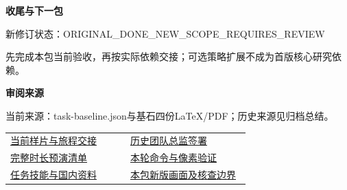 \documentclass[11pt,a4paper]{article}
\newcommand{\reviewsubsection}[1]{\par\Needspace{4\baselineskip}\vspace{4pt}\begin{center}{\titlelatin\titlecjk\bfseries\fontsize{12}{18}\selectfont #1}\end{center}}
\begin{document}
\reviewsubsection{3.3 收尾与下一包}
新修订状态：ORIGINAL\_\allowbreak{}DONE\_\allowbreak{}NEW\_\allowbreak{}SCOPE\_\allowbreak{}REQUIRES\_\allowbreak{}REVIEW


先完成本包当前验收，再按实际依赖交接；可选策略扩展不成为首版核心研究依赖。


\begin{minipage}{\linewidth}
\reviewsubsection{3.4 审阅来源}
当前来源：task-\allowbreak{}baseline.json与基石四份LaTeX/\allowbreak{}PDF；历史来源见归档总结。


\begingroup\small\setlength{\tabcolsep}{4pt}\begin{tabular}{@{}p{0.48\linewidth}p{0.48\linewidth}@{}}
\href{file:///D:/Agent/srp/agent/tasks/V-04/outputs/current-preview.md}{当前样片与旅程交接} & \href{file:///D:/Agent/srp/agent/governance/planning/2026-08-05_SRP_IJHCI_\%E5\%85\%A8\%E9\%A1\%B9\%E7\%9B\%AE1-12\%E6\%AD\%A5\%E8\%A7\%84\%E5\%88\%92\%E8\%AE\%BE\%E8\%AE\%A1\%E5\%8C\%85_v1.0/20_\%E4\%BA\%A7\%E5\%93\%81\%E4\%B8\%8E\%E5\%9C\%BA\%E6\%99\%AF\%E8\%AE\%BE\%E8\%AE\%A1/V-04_\%E5\%AE\%8C\%E6\%95\%B4\%E5\%88\%86\%E9\%95\%9C\%E4\%B8\%8E\%E7\%9C\%9F\%E5\%AE\%9E\%E6\%97\%B6\%E9\%95\%BF\%E5\%A3\%B0\%E9\%9F\%B3\%E9\%A2\%84\%E6\%BC\%94/V-04_\%E7\%8B\%AC\%E7\%AB\%8B\%E5\%A4\%8D\%E6\%A0\%B8\%E4\%B8\%8E\%E5\%9B\%A2\%E9\%98\%9F\%E6\%80\%BB\%E7\%9B\%91\%E7\%AD\%BE\%E6\%94\%B6\%E6\%8A\%A5\%E5\%91\%8A_\%E5\%B7\%B2\%E7\%AD\%BE\%E7\%BD\%B2.md}{历史团队总监签署}\\[4pt]
\href{file:///D:/Agent/srp/agent/governance/planning/2026-08-05_SRP_IJHCI_\%E5\%85\%A8\%E9\%A1\%B9\%E7\%9B\%AE1-12\%E6\%AD\%A5\%E8\%A7\%84\%E5\%88\%92\%E8\%AE\%BE\%E8\%AE\%A1\%E5\%8C\%85_v1.0/20_\%E4\%BA\%A7\%E5\%93\%81\%E4\%B8\%8E\%E5\%9C\%BA\%E6\%99\%AF\%E8\%AE\%BE\%E8\%AE\%A1/V-04_\%E5\%AE\%8C\%E6\%95\%B4\%E5\%88\%86\%E9\%95\%9C\%E4\%B8\%8E\%E7\%9C\%9F\%E5\%AE\%9E\%E6\%97\%B6\%E9\%95\%BF\%E5\%A3\%B0\%E9\%9F\%B3\%E9\%A2\%84\%E6\%BC\%94/V-04_\%E5\%AE\%8C\%E6\%95\%B4\%E6\%97\%B6\%E9\%95\%BFAnimatic\%E5\%80\%99\%E9\%80\%89\%E6\%B8\%85\%E5\%8D\%95_v1.0.json}{完整时长预演清单} & \href{file:///D:/Agent/srp/agent/tasks/V-04/evidence/verification.json}{本轮命令与像素验证}\\[4pt]
\href{file:///D:/Agent/srp/agent/governance/planning/2026-08-05_SRP_IJHCI_\%E5\%85\%A8\%E9\%A1\%B9\%E7\%9B\%AE1-12\%E6\%AD\%A5\%E8\%A7\%84\%E5\%88\%92\%E8\%AE\%BE\%E8\%AE\%A1\%E5\%8C\%85_v1.0/24_\%E5\%9B\%A2\%E9\%98\%9F\%E4\%BB\%BB\%E5\%8A\%A1\%E4\%B8\%8E\%E9\%A1\%B9\%E7\%9B\%AE\%E6\%B2\%BB\%E7\%90\%86/08_\%E4\%BB\%BB\%E5\%8A\%A1\%E6\%8A\%80\%E8\%83\%BD\%E4\%B8\%8E\%E5\%9B\%BD\%E5\%86\%85\%E5\%AD\%A6\%E4\%B9\%A0\%E8\%B5\%84\%E6\%96\%99_v1.0.md}{任务技能与国内资料} & \href{file:///D:/Agent/srp/agent/tasks/V-04/outputs/current-implementation-evidence.md}{本包新版画面及核查边界}\\[4pt]

\end{tabular}
\end{minipage}
\end{document}
